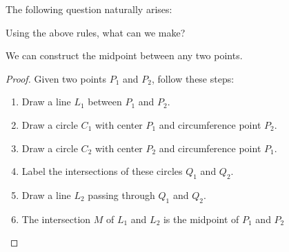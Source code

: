 The following question naturally arises:

\begin{rmkbox}
	Using the above rules, what can we make?
\end{rmkbox}

\begin{example}
	We can construct the midpoint between any two points.
	\begin{proof}
		Given two points $P_1$ and $P_2$, follow these steps:
		\begin{enumerate}[label={\bfseries\sffamily\color{main}(\arabic*)}]
			\item Draw a line $L_1$ between $P_1$ and $P_2$.
			\item Draw a circle $C_1$ with center $P_1$ and circumference point $P_2$.
			\item Draw a circle $C_2$ with center $P_2$ and circumference point $P_1$.
			\item Label the intersections of these circles $Q_1$ and $Q_2$.
			\item Draw a line $L_2$ passing through $Q_1$ and $Q_2$.
			\item The intersection $M$ of $L_1$ and $L_2$ is the midpoint of $P_1$ and $P_2$
		\end{enumerate}

		\begin{center}
		\end{center}
	\end{proof}
\end{example}

